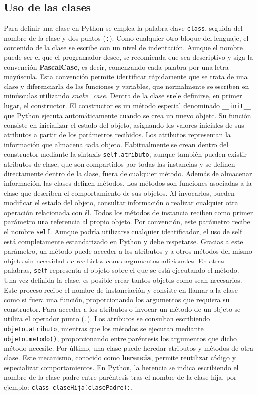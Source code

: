 \documentclass[11pt,a5paper,twoside]{book}
\begin{document}
\subsection{Uso de las clases}
Para definir una clase en Python se emplea la palabra clave {\scriptsize \texttt{class}}, seguida del nombre de la clase y dos puntos ({\scriptsize \texttt{:}}). Como cualquier otro bloque del lenguaje, el contenido de la clase se escribe con un nivel de indentación. Aunque el nombre puede ser el que el programador desee, se recomienda que sea descriptivo y siga la convención \textbf{PascalCase}, es decir, comenzando cada palabra por una letra mayúscula. Esta convención permite identificar rápidamente que se trata de una clase y diferenciarla de las funciones y variables, que normalmente se escriben en minúsculas utilizando \textit{snake\_case}.
Dentro de la clase suele definirse, en primer lugar, el constructor. El constructor es un método especial denominado {\scriptsize \texttt{\_\_init\_\_}} que Python ejecuta automáticamente cuando se crea un nuevo objeto. Su función consiste en inicializar el estado del objeto, asignando los valores iniciales de sus atributos a partir de los parámetros recibidos.
Los atributos representan la información que almacena cada objeto. Habitualmente se crean dentro del constructor mediante la sintaxis {\scriptsize \texttt{self.atributo}}, aunque también pueden existir atributos de clase, que son compartidos por todas las instancias y se definen directamente dentro de la clase, fuera de cualquier método.
Además de almacenar información, las clases definen métodos. Los métodos son funciones asociadas a la clase que describen el comportamiento de sus objetos. Al invocarlos, pueden modificar el estado del objeto, consultar información o realizar cualquier otra operación relacionada con él.
Todos los métodos de instancia reciben como primer parámetro una referencia al propio objeto. Por convención, este parámetro recibe el nombre {\scriptsize \texttt{self}}. Aunque podría utilizarse cualquier identificador, el uso de self está completamente estandarizado en Python y debe respetarse. Gracias a este parámetro, un método puede acceder a los atributos y a otros métodos del mismo objeto sin necesidad de recibirlos como argumentos adicionales. En otras palabras, {\scriptsize \texttt{self}} representa el objeto sobre el que se está ejecutando el método.
Una vez definida la clase, es posible crear tantos objetos como sean necesarios. Este proceso recibe el nombre de instanciación y consiste en llamar a la clase como si fuera una función, proporcionando los argumentos que requiera su constructor.
Para acceder a los atributos o invocar un método de un objeto se utiliza el operador punto ({\scriptsize \texttt{.}}). Los atributos se consultan escribiendo {\scriptsize \texttt{objeto.atributo}}, mientras que los métodos se ejecutan mediante {\scriptsize \texttt{objeto.metodo()}}, proporcionando entre paréntesis los argumentos que dicho método necesite.
Por último, una clase puede heredar atributos y métodos de otra clase. Este mecanismo, conocido como \textbf{herencia}, permite reutilizar código y especializar comportamientos. En Python, la herencia se indica escribiendo el nombre de la clase padre entre paréntesis tras el nombre de la clase hija, por ejemplo: {\scriptsize \texttt{class claseHija(clasePadre):}}.
\end{document}
